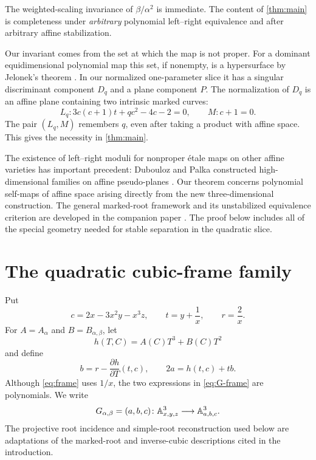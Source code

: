 \documentclass[11pt,reqno]{amsart}
\begin{document}
The weighted-scaling invariance of \(\beta/\alpha^2\) is immediate.  The
content of \cref{thm:main} is completeness under \emph{arbitrary} polynomial
left--right equivalence and after arbitrary affine stabilization.

Our invariant comes from the set at which the map is not proper.  For a
dominant equidimensional polynomial map this set, if nonempty, is a
hypersurface by Jelonek's theorem \cite{jelonek1993nonproper}.  In our
normalized one-parameter slice it has a singular discriminant component
\(D_q\) and a plane component \(P\).  The normalization of \(D_q\) is an
affine plane containing two intrinsic marked curves:
\[
L_q:
3c(c+1)t+qc^2-4c-2=0,
\qquad
M:c+1=0.
\]
The pair \((L_q,M)\) remembers \(q\), even after taking a product with
affine space.  This gives the necessity in \cref{thm:main}.

The existence of left--right moduli for nonproper étale maps on other affine
varieties has important precedent: Dubouloz and Palka constructed
high-dimensional families on affine pseudo-planes
\cite{duboulozPalka2019}.  Our theorem concerns polynomial self-maps of
affine space arising directly from the new three-dimensional construction.
The general marked-root framework and its unstabilized equivalence criterion
are developed in the companion paper \cite{monson2026markedroot}.  The proof
below includes all of the special geometry needed for stable separation in
the quadratic slice.

\section{The quadratic cubic-frame family}
\label{sec:family}

Put
\begin{equation}
\label{eq:frame}
c=2x-3x^2y-x^3z,\qquad
t=y+\frac1x,\qquad
r=\frac2x.
\end{equation}
For \(A=A_\alpha\) and \(B=B_{\alpha,\beta}\), let
\[
h(T,C)=A(C)T^3+B(C)T^2
\]
and define
\begin{equation}
\label{eq:G-frame}
b=r-\frac{\partial h}{\partial T}(t,c),
\qquad
2a=h(t,c)+tb.
\end{equation}
Although \eqref{eq:frame} uses \(1/x\), the two expressions in
\eqref{eq:G-frame} are polynomials.  We write
\[
G_{\alpha,\beta}=(a,b,c)
\colon\mathbb A^3_{x,y,z}\longrightarrow\mathbb A^3_{a,b,c}.
\]
The projective root incidence and simple-root reconstruction used below are
adaptations of the marked-root and inverse-cubic descriptions cited in the
introduction.
\end{document}
